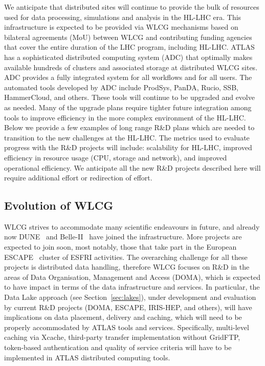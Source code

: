
We anticipate that distributed sites will continue to provide the bulk of resources used for data processing, simulations and analysis in the HL-LHC era. This infrastructure is expected to be provided via WLCG mechanisms based on bilateral agreements (MoU) between WLCG and contributing funding agencies that cover the entire duration of the LHC program, including HL-LHC. ATLAS has a sophisticated distributed computing system (ADC) that optimally makes available hundreds of clusters and associated storage at distributed WLCG sites. ADC provides a fully integrated system for all workflows and for all users. The automated tools developed by ADC include ProdSys, PanDA, Rucio, SSB, HammerCloud, and others. These tools will continue to be upgraded and evolve as needed. Many of the upgrade plans require tighter future integration among tools to improve efficiency in the more complex environment of the HL-LHC. Below we provide a few examples of long range R\&D plans which are needed to transition to the new challenges at the HL-LHC. The metrics used to evaluate progress with the R\&D projects will include: scalability for HL-LHC, improved efficiency in resource usage (CPU, storage and network), and improved operational efficiency. We anticipate all the new R\&D projects described here will require additional effort or redirection of effort.

\subsection{Evolution of WLCG}
\label{sec:wlcg}

WLCG strives to accommodate many scientific endeavours in future, and already now DUNE~\cite{DUNE2018} and Belle-II~\cite{Belle-II} have joined the infrastructure. More projects are expected to join soon, most notably, those that take part in the European ESCAPE~\cite{EU-ESCAPE} cluster of ESFRI activities. The overarching challenge for all these projects is distributed data handling, therefore WLCG focuses on R\&D in the areas of Data Organisation, Management and Access (DOMA), which is expected to have impact in terms of the data infrastructure and services. In particular, the Data Lake approach (see Section~\ref{sec:lakes}), under development and evaluation by current R\&D projects (DOMA, ESCAPE, IRIS-HEP, and others), will have implications on data placement, delivery and caching, which will need to be properly accommodated by ATLAS tools and services. Specifically, multi-level caching via Xcache, third-party transfer implementation without GridFTP, token-based authentication and quality of service criteria will have to be implemented in ATLAS distributed computing tools. 

